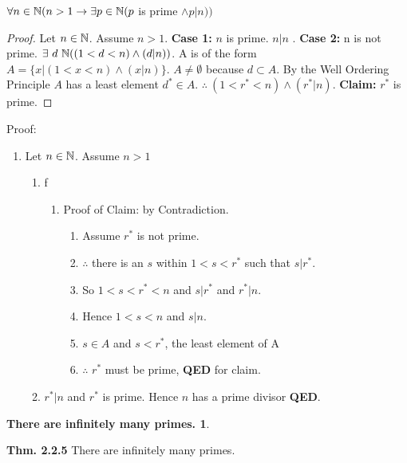 
\begin{theorem}
$\forall n \in \mathbb{N} ( n > 1 \to \exists p \in \mathbb{N} ( p$ is prime $\wedge p|n)) $
\end{theorem}
\begin{proof}
Let $n\in\mathbb{N}$. Assume $n>1$. \textbf{Case 1:} $n$ is prime. $n|n$ \checkmark. \textbf{Case 2:} n is not prime. $\exists\ d\ \mathbb{N} ((1<d<n) \wedge (d|n))$. A is of the form $A = \{ x | (1 < x < n) \wedge (x|n) \}$. $A \neq \emptyset$ because $d \subset A$. By the Well Ordering Principle $A$ has a least element $d^*\in A$. $\therefore\ (1 < r^* < n) \wedge (r^*|n)$. \textbf{Claim:} $r^*$ is prime.
\end{proof}
Proof: 
\begin{enumerate}
\item Let $n\in\mathbb{N}$. Assume $n>1$
\begin{enumerate}
\item f
	\begin{enumerate} 
		\item Proof of Claim: by Contradiction.
		\begin{enumerate}
			\item Assume $r^*$ is not prime.
			\item $\therefore$ there is an $s$ within $1<s<r^*$ such that $s|r^*$.
			\item So $1<s<r^*<n$ and $s|r^*$ and $r^*|n$.
			\item Hence $1<s<n$ and $s|n$.
			\item $s\in A$ and $s<r^*$, the least element of A
			\item $\therefore$ $r^*$ must be prime, \textbf{QED} for claim.
		\end{enumerate}
	\end{enumerate}
	\item $r^*|n$ and $r^*$ is prime. Hence $n$ has a prime divisor \textbf{QED}.
\end{enumerate}
\end{enumerate}

\newtheorem*{primes}{There are infinitely many primes.}
\begin{primes}\end{primes}
\textbf{Thm. 2.2.5} There are infinitely many primes.



